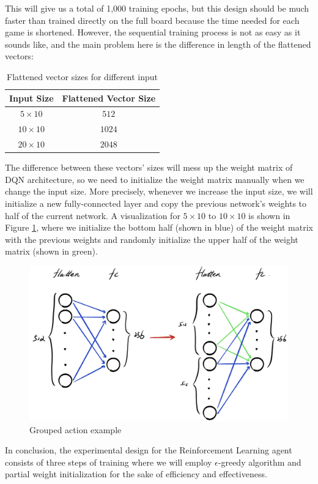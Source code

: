 \documentclass[letterpaper]{article} %
\begin{document}
\begin{itemize}
\begin{enumerate}
    This will give us a total of 1,000 training epochs, but this design should be much faster than trained directly on the full board because the time needed for each game is shortened. However, the sequential training process is not as easy as it sounds like, and the main problem here is the difference in length of the flattened vectors:

    \begin{table}[h!]
      \centering
      \normalsize{
        \begin{tabular}{ |c|c| } 
          \hline
          Input Size & Flattened Vector Size  \\ 
          \hline
           $5\times 10$ & $512$  \\ 
           \hline
           $10\times 10$ & $1024$  \\ 
           \hline
           $20\times 10$ & $2048$  \\
           \hline
          \end{tabular}}
      \caption{Flattened vector sizes for different input}
      \label{tab:rewardsCopy}
    \end{table} 

    The difference between these vectors' sizes will mess up the weight matrix of DQN architecture, so we need to initialize the weight matrix manually when we change the input size. More precisely, whenever we increase the input size, we will initialize a new fully-connected layer and copy the previous network's weights to half of the current network. A visualization for $5\times 10$ to $10\times 10$ is shown in Figure \ref{fig:training}, where we initialize the bottom half (shown in blue) of the weight matrix with the previous weights and randomly initialize the upper half of the weight matrix (shown in green).

    \begin{figure}[h]
      \centering
      \includegraphics[width=0.9\linewidth]{figures/architecutre.jpeg}
      \caption{Grouped action example}
      \label{fig:training}
    \end{figure}


  \end{enumerate}
  In conclusion, the experimental design for the Reinforcement Learning agent consists of three steps of training where we will employ $\epsilon$-greedy algorithm and partial weight initialization for the sake of efficiency and effectiveness. 
\end{itemize}
\end{document}
